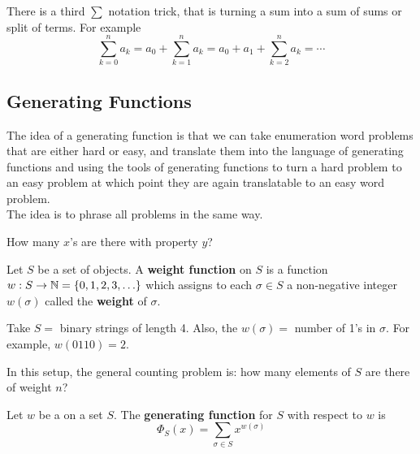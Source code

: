 \documentclass[english, 11pt]{article}
\begin{document}
  There is a third $\sum$ notation trick, that is turning a sum into a sum of sums or split of terms. For example
  \[ \sum_{k=0}^n a_k = a_0 + \sum_{k=1}^n a_k = a_0 + a_1 + \sum_{k=2}^n a_k = \cdots \]

  \subsection{Generating Functions}

  The idea of a generating function is that we can take enumeration word problems that are either hard or easy, and translate them into the language of generating functions and using the tools of generating functions to turn a hard problem to an easy problem at which point they are again translatable to an easy word problem. \\

  The idea is to phrase all problems in the same way.

  \begin{center}
    How many $x$'s are there with property $y$?
  \end{center}

  \begin{defn}\label{weight function}
    Let $S$ be a set of objects. A \textbf{weight function} on $S$ is a function $w:S\rightarrow {\mathbb{N}} = \{0,1,2,3,\ldots\}$ which assigns to each $\sigma \in S$ a non-negative integer $w(\sigma)$ called the \textbf{weight} of $\sigma$.
  \end{defn}

  \begin{exmp}
    Take $S =$ binary strings of length 4. Also, the  $w(\sigma) =$ number of 1's in $\sigma$. For example, $w(0110) = 2$.
  \end{exmp}

  In this setup, the general counting problem is: how many elements of $S$ are there of weight $n$?

   \begin{defn}\label{generating function}
     Let $w$ be a  on a set $S$. The \textbf{generating function} for $S$ with respect to $w$ is
     \[ \Phi_S(x) = \sum_{\sigma \in S} x^{w(\sigma)} \]
   \end{defn}
\end{document}
